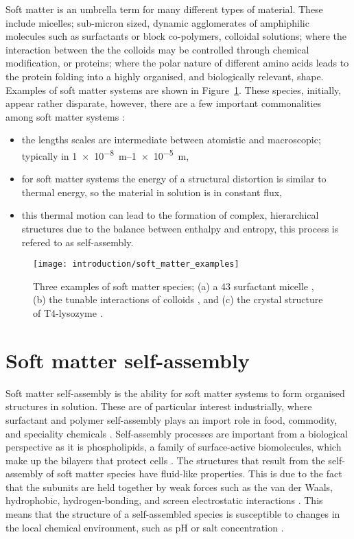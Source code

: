 Soft matter is an umbrella term for many different types of material.
These include micelles; sub-micron sized, dynamic agglomerates of amphiphilic molecules such as surfactants or block co-polymers, colloidal solutions; where the interaction between the the colloids may be controlled through chemical modification, or proteins; where the polar nature of different amino acids leads to the protein folding into a highly organised, and biologically relevant, shape.
Examples of soft matter systems are shown in Figure~\ref{fig:soft}.
These species, initially, appear rather disparate, however, there are a few important commonalities among soft matter systems \cite{jones_soft_2002}:
\begin{itemize}
  \item the lengths scales are intermediate between atomistic and macroscopic; typically in \SIrange{1e-8}{1e-5}{\meter},
  \item for soft matter systems the energy of a structural distortion is similar to thermal energy, so the material in solution is in constant flux,
  \item this thermal motion can lead to the formation of complex, hierarchical structures due to the balance between enthalpy and entropy, this process is refered to as self-assembly.
\end{itemize}
%
\begin{figure}
    \centering
    \texttt{[image: introduction/soft\_matter\_examples]}
    \caption{Three examples of soft matter species; (a) a 43  surfactant micelle \cite{hargreaves_atomistic_2011}, (b) the tunable interactions of colloids \cite{kraft_patchy_2011}, and (c) the crystal structure of T4-lysozyme \cite{rose_crystal_1988}.}
    \label{fig:soft}
\end{figure}
%

\section{Soft matter self-assembly}

Soft matter self-assembly is the ability for soft matter systems to form organised structures in solution.
These are of particular interest industrially, where surfactant and polymer self-assembly plays an import role in food, commodity, and speciality chemicals \cite{schramm_surfactants_2003}.
Self-assembly processes are important from a biological perspective as it is phospholipids, a family of surface-active biomolecules, which make up the bilayers that protect cells \cite{simons_lipid_2000}.
The structures that result from the self-assembly of soft matter species have fluid-like properties.
This is due to the fact that the subunits are held together by weak forces such as the van der Waals, hydrophobic, hydrogen-bonding, and screen electrostatic interactions \cite{israelachvili_intermolecular_2011}.
This means that the structure of a self-assembled species is susceptible to changes in the local chemical environment, such as pH or salt concentration \cite{schmaljohann_thermo-_2006,sammalkorpi_ionic_2009}.

